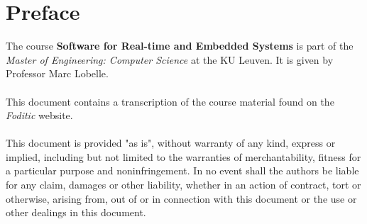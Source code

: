 \documentclass[main.tex]{subfiles}
\begin{document}
\chapter*{Preface}
The course \textbf{Software for Real-time and Embedded Systems} is part of the \textit{Master of Engineering: Computer Science} at the KU Leuven. It is given by Professor Marc Lobelle.
\\\\
This document contains a transcription of the course material found on the \textit{Foditic} website.
\\\\
This document is provided "as is", without warranty of any kind, express or implied, including but not limited to the warranties of merchantability, fitness for a particular purpose and noninfringement.
In no event shall the authors be liable for any claim, damages or other liability, whether in an action of contract, tort or otherwise, arising from, out of or in connection with this document or the use or other dealings in this document.
\end{document}
